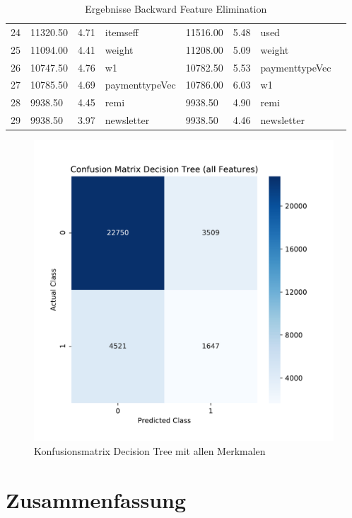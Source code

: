 \begin{table}[]
\begin{tabular*}{\textwidth}{c @{\extracolsep{\fill}} lllllll}
24 & 11320.50 & 4.71 & itemseff & 11516.00 & 5.48 & used \\
25 & 11094.00 & 4.41 & weight & 11208.00 & 5.09 & weight \\
26 & 10747.50 & 4.76 & w1 & 10782.50 & 5.53 & paymenttypeVec \\
27 & 10785.50 & 4.69 & paymenttypeVec & 10786.00 & 6.03 & w1 \\
28 & 9938.50 & 4.45 & remi & 9938.50 & 4.90 & remi \\
29 & 9938.50 & 3.97 & newsletter & 9938.50 & 4.46 & newsletter \\
\bottomrule
\end{tabular*}
\caption{Ergebnisse Backward Feature Elimination}
\label{table: Backward}
\end{table}
\FloatBarrier
 
 

\FloatBarrier
\begin{figure}[!htbp]
\begin{center}
\includegraphics[scale=0.5]{pdf/confusion2.pdf}
\end{center}
\caption{Konfusionsmatrix Decision Tree mit allen Merkmalen}
\label{fig:confusionFinal}
\end{figure}
\FloatBarrier

\chapter{Zusammenfassung}






